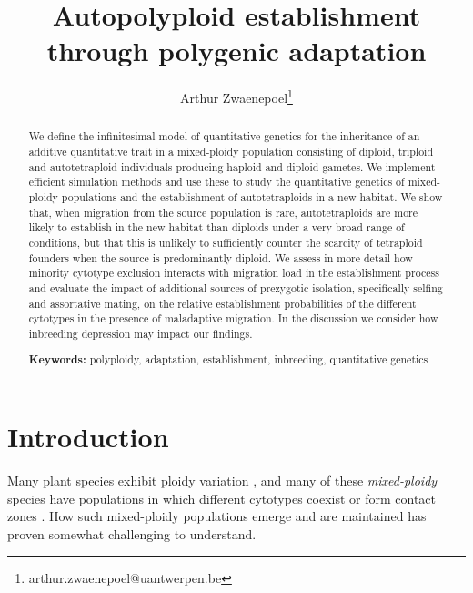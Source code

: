 \documentclass[12pt,a4paper]{article}
\begin{document}
    \title{Autopolyploid establishment through polygenic adaptation}
    \author[1]{Arthur Zwaenepoel\thanks{arthur.zwaenepoel@uantwerpen.be}}
    \date{\vspace{-5ex}}
    \maketitle
    \begin{abstract}
    We define the infinitesimal model of quantitative genetics for the inheritance
        of an additive quantitative trait in a mixed-ploidy population consisting
        of diploid, triploid and autotetraploid individuals producing haploid and
        diploid gametes.
        We implement efficient simulation methods and use these to study the
        quantitative genetics of mixed-ploidy populations and the establishment of
        autotetraploids in a new habitat.
        We show that, when migration from the source population is rare,
        autotetraploids are more likely to establish in the new habitat 
        than diploids under a very broad range of conditions, but that this
        is unlikely to sufficiently counter the scarcity of tetraploid founders
        when the source is predominantly diploid.
        We assess in more detail how minority cytotype exclusion interacts with
        migration load in the establishment process and evaluate the impact of
        additional sources of prezygotic isolation, specifically selfing and
        assortative mating, on the relative establishment probabilities of the
        different cytotypes in the presence of maladaptive migration.
        In the discussion we consider how inbreeding depression may impact our
        findings.

        \textbf{Keywords:} polyploidy, adaptation, establishment, inbreeding,
        quantitative genetics 
    \end{abstract}

    \section*{Introduction}

    Many plant species exhibit ploidy variation
    \citep{levin2002,soltis2007,rice2015}, and many of these \textit{mixed-ploidy}
    species have populations in which different cytotypes coexist or form contact
    zones \citep{kolar2017}.
    How such mixed-ploidy populations emerge and are maintained has proven somewhat
    challenging to understand.
\end{document}
